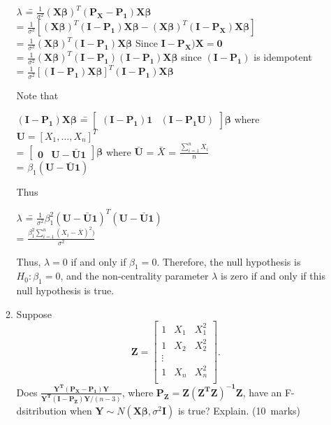 \documentclass[soln,12pt]{utarexam}
\begin{document}
\begin{enumerate}
\begin{enumerate}
\begin{answer}
\begin{tabbing}
$\lambda$ \== $\frac{1}{\sigma^2}(\mathbf{X}\bm{\beta})^T(\mathbf{P_X-P_1})\mathbf{X}\bm{\beta}$\\
\>= $\frac{1}{\sigma^2}[(\mathbf{X}\bm{\beta})^T(\mathbf{I-P_1})\mathbf{X}\bm{\beta}-(\mathbf{X}\bm{\beta})^T(\mathbf{I-P_X})\mathbf{X}\bm{\beta}]$\\
\>= $\frac{1}{\sigma^2}(\mathbf{X}\bm{\beta})^T(\mathbf{I-P_1})\mathbf{X}\bm{\beta}$ Since $\mathbf{I-P_X)X} = \mathbf{0}$\\
\>= $\frac{1}{\sigma^2}(\mathbf{X}\bm{\beta})^T(\mathbf{I-P_1})(\mathbf{I-P_1})\mathbf{X}\bm{\beta}$ since $(\mathbf{I-P_1})$ is idempotent\\
\>= $\frac{1}{\sigma^2}[(\mathbf{I-P_1})\mathbf{X}\bm{\beta}]^T(\mathbf{I-P_1})\mathbf{X}\bm{\beta}$
\end{tabbing}
Note that 
\begin{tabbing}
$(\mathbf{I-P_1})\mathbf{X}\bm{\beta}$ \== $\begin{bmatrix}(\mathbf{I-P_1})\mathbf{1}&(\mathbf{I-P_1}\mathbf{U})\end{bmatrix}\bm{\beta}$ where $\mathbf{U} = [X_1,\ldots, X_n]^T$\\
\>= $\begin{bmatrix}\mathbf{0}& \mathbf{U}- \mathbf{\bar U} \mathbf{1} \end{bmatrix}\bm{\beta}$ where $\mathbf{\bar U}$ = $\bar X$ = $\frac{\sum_{i=1}^nX_i}{n}$\\
\>= $\beta_1(\mathbf{U}- \mathbf{\bar U} \mathbf{1})$
\end{tabbing}
Thus
\begin{tabbing}
$\lambda$ \== $\frac{1}{\sigma^2}\beta_1^2(\mathbf{U}- \mathbf{\bar U} \mathbf{1})^T(\mathbf{U}- \mathbf{\bar U} \mathbf{1})$\\
\>= $\frac{\beta_1^2\sum_{i=1}^n(X_i-\bar X)^2)}{\sigma^2}$
\end{tabbing}
Thus, $\lambda = 0$ if and only if $\beta_1 = 0$. Therefore, the null hypothesis is $H_0: \beta_1 = 0$,
and the non-centrality parameter $\lambda$ is zero if and only if this null hypothesis is true.
\end{answer}

\item Suppose\\
$$\mathbf{Z} = \begin{bmatrix}1&X_1&X_1^2\\1&X_2&X_2^2\\\vdots\\1&X_n&X_n^2\\\end{bmatrix}.$$ 
Does $\frac{\mathbf{Y^T(P_X-P_1)Y}}{\mathbf{Y^T(I-P_Z)Y}/(n-3)}$, where $\mathbf{P_Z} = \mathbf{Z(Z^TZ)^{-1}Z}$,  have an F-dsitribution when $\mathbf{Y} \sim N(\mathbf{X}\bm{\beta}, \sigma^2\mathbf{I})$ is true? Explain. \hfill(10~marks)


\end{enumerate}
\end{enumerate}
\end{document}
